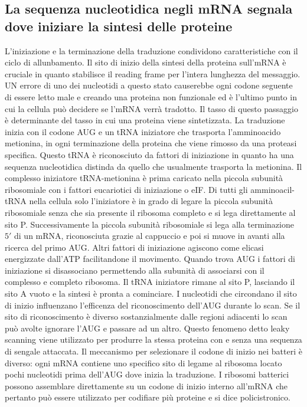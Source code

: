 \subsection{La sequenza nucleotidica negli mRNA segnala dove iniziare la sintesi delle proteine}
L'iniziazione e la terminazione della traduzione condividono caratteristiche con il ciclo di allunbamento. Il sito di inizio della sintesi della proteina sull'mRNA \`e cruciale in quanto
stabilisce il reading frame per l'intera lunghezza del messaggio. UN errore di uno dei nucleotidi a questo stato causerebbe ogni codone seguente di essere letto male e creando una 
proteina non funzionale ed \`e l'ultimo punto in cui la cellula pu\`o decidere se l'mRNA verr\`a tradotto. Il tasso di questo passaggio \`e determinante del tasso in cui una proteina 
viene sintetizzata. La traduzione inizia con il codone AUG e un tRNA iniziatore che trasporta l'amminoacido metionina, in ogni terminazione  della proteina che viene rimosso
da una proteasi specifica. Questo tRNA \`e riconosciuto da fattori di iniziazione in quanto ha una sequenza nucleotidica distinda da quello che usualmente trasporta la metionina. Il
complesso iniziatore tRNA-metionina \`e prima caricato nella piccola subunit\`a ribosomiale con i fattori eucariotici di iniziazione o eIF. Di tutti gli amminoacil-tRNA nella cellula 
solo l'iniziatore \`e in grado di legare la piccola subunit\`a ribosomiale senza che sia presente il ribosoma completo e si lega direttamente al sito P. Successivamente la piccola 
subunit\`a ribosomiale si lega alla terminazione $5'$ di un mRNA, riconosciuta grazie al cappuccio e poi si muove in avanti alla ricerca del primo AUG. Altri fattori di iniziazione 
agiscono come elicasi energizzate dall'ATP facilitandone il movimento. Quando trova AUG i fattori di iniziazione si disassociano permettendo alla subunit\`a di associarsi con il
complesso e completo ribosoma. Il tRNA iniziatore rimane al sito P, lasciando il sito A vuoto e la sintesi \`e pronta a cominciare. I nucleotidi che circondano il sito di inizio 
influenzano l'efficenza del riconoscimento dell'AUG durante lo scan. Se il sito di riconoscimento \`e diverso sostanzialmente dalle regioni adiacenti lo scan pu\`o avolte ignorare l'AUG
e passare ad un altro. Questo fenomeno detto leaky scanning viene utilizzato per produrre la stessa proteina con e senza una sequenza di sengale attaccata. Il meccanismo per selezionare 
il codone di inizio nei batteri \`e diverso: ogni mRNA contiene uno specifico sito di legame al ribosoma locato pochi nucleotidi prima dell'AUG dove inizia la traduzione. I ribosomi 
batterici possono assemblare direttamente su un codone di inizio interno all'mRNA che pertanto pu\`o essere utilizzato per codifiare pi\`u proteine e si dice policistronico. 
